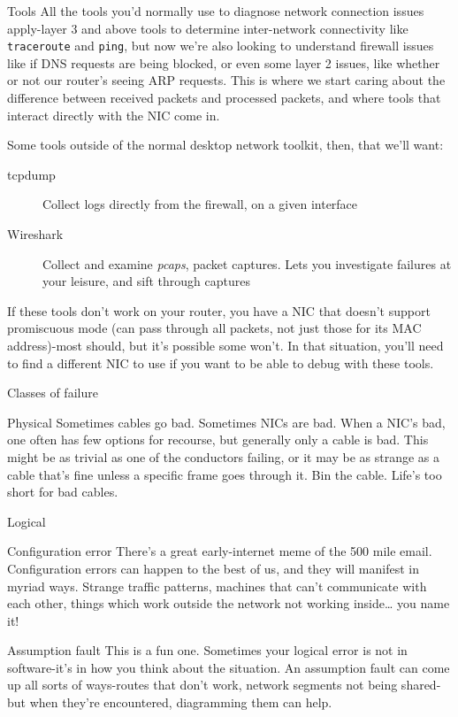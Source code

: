 \documentclass[bigger]{beamer}
\begin{document}
\begin{frame}[fragile,label={sec:orgba55011}]{Tools}
 All the tools you'd normally use to diagnose network connection issues
apply-layer 3 and above tools to determine inter-network connectivity like
\texttt{traceroute} and \texttt{ping}, but now we're also looking to understand firewall
issues like if DNS requests are being blocked, or even some layer 2 issues, like
whether or not our router's seeing ARP requests. This is where we start caring
about the difference between received packets and processed packets, and where
tools that interact directly with the NIC come in.

Some tools outside of the normal desktop network toolkit, then, that we'll want:
\begin{description}
\item[{tcpdump}] Collect logs directly from the firewall, on a given interface
\item[{Wireshark}] Collect and examine \emph{pcaps}, packet captures. Lets you
investigate failures at your leisure, and sift through captures
\end{description}

If these tools don't work on your router, you have a NIC that doesn't support
promiscuous mode (can pass through all packets, not just those for its MAC
address)-most should, but it's possible some won't. In that situation, you'll
need to find a different NIC to use if you want to be able to debug with these
tools.
\end{frame}

\begin{frame}[label={sec:org477961b}]{Classes of failure}
\begin{block}{Physical}
Sometimes cables go bad. Sometimes NICs are bad. When a NIC's bad, one often has
few options for recourse, but generally only a cable is bad. This might be as
trivial as one of the conductors failing, or it may be as strange as a cable
that's fine unless a specific frame goes through it. Bin the cable. Life's too
short for bad cables.
\end{block}

\begin{block}{Logical}
\begin{block}{Configuration error}
There's a great early-internet meme of the 500 mile email. Configuration
errors can happen to the best of us, and they will manifest in myriad
ways. Strange traffic patterns, machines that can't communicate with each
other, things which work outside the network not working inside\ldots{} you
name it!
\end{block}

\begin{block}{Assumption fault}
This is a fun one. Sometimes your logical error is not in software-it's in
how you think about the situation. An assumption fault can come up all
sorts of ways-routes that don't work, network segments not being
shared-but when they're encountered, diagramming them can help.
\end{block}
\end{block}
\end{frame}
\end{document}
